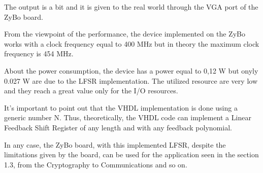 \documentclass[a4paper]{report}
\begin{document}
\noindent The output is a bit and it is given to the real world through the VGA port of the ZyBo board.

\noindent From the viewpoint of the performance, the device implemented on the ZyBo works with a clock frequency equal to 400 MHz but in theory the maximum clock frequency is 454 MHz.

\noindent About the power consumption, the device has a power equal to 0,12 W but onyly 0.027 W are due to the LFSR implementation. The utilized resource are very low and they reach a great value only for the I/O resources.

\noindent It's important to point out that the VHDL implementation is done using a generic number N. Thus, theoretically, the VHDL code can implement a Linear Feedback Shift Register of any length and with any feedback polynomial.

\noindent In any case, the ZyBo board, with this implemented LFSR, despite the limitations given by the board, can be used for the application seen in the section 1.3, from the Cryptography to Communications and so on.
\end{document}
